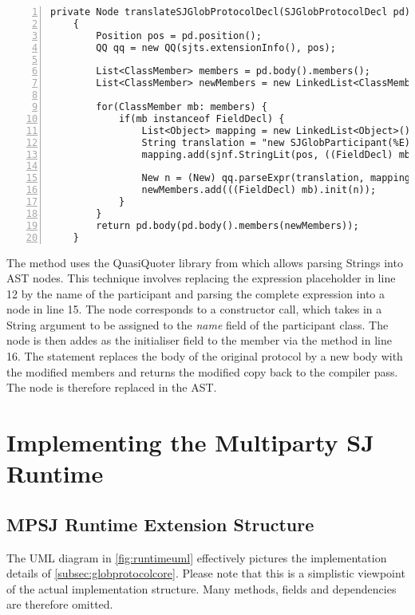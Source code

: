\begin{lstlisting}[basicstyle=\LISTINGSTYLE, numbers=left]
	private Node translateSJGlobProtocolDecl(SJGlobProtocolDecl pd) throws SemanticException
	{		
		Position pos = pd.position();
		QQ qq = new QQ(sjts.extensionInfo(), pos);
		
		List<ClassMember> members = pd.body().members();
		List<ClassMember> newMembers = new LinkedList<ClassMember>();	
		
		for(ClassMember mb: members) {
			if(mb instanceof FieldDecl) {
				List<Object> mapping = new LinkedList<Object>();
				String translation = "new SJGlobParticipant(%E)";
				mapping.add(sjnf.StringLit(pos, ((FieldDecl) mb).name()));
			
				New n = (New) qq.parseExpr(translation, mapping);
				newMembers.add(((FieldDecl) mb).init(n));
			}
		}
		return pd.body(pd.body().members(newMembers));
	}
\end{lstlisting}

The method uses the QuasiQuoter library from  which allows parsing Strings into AST nodes. This technique involves replacing the expression placeholder  in line 12 by the name of the participant and parsing the complete expression into a  node in line 15. The  node corresponds to a  constructor call, which takes in a String argument to be assigned to the \textit{name} field of the participant class. The node is then addes as the initialiser field to the member via the method  in line 16. The  statement replaces the body of the original protocol by a new body with the modified members and returns the modified copy back to the compiler pass. The node is therefore replaced in the AST. 

\section{Implementing the Multiparty SJ Runtime}

\subsection{MPSJ Runtime Extension Structure}

The UML diagram in \autoref{fig:runtimeuml} effectively pictures the implementation details of \autoref{subsec:globprotocolcore}. Please note that this is a simplistic viewpoint of the actual implementation structure. Many methods, fields and dependencies are therefore omitted.

